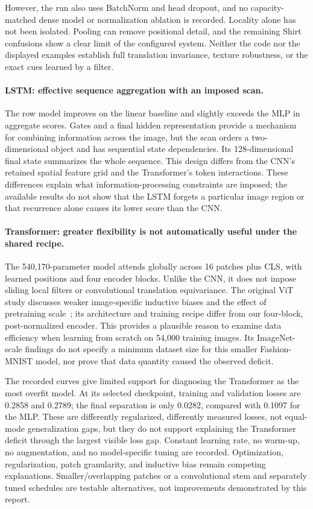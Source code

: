 However, the run also uses BatchNorm and head dropout, and no capacity-matched dense model or normalization ablation is recorded. Locality alone has not been isolated. Pooling can remove positional detail, and the remaining Shirt confusions show a clear limit of the configured system. Neither the code nor the displayed examples establish full translation invariance, texture robustness, or the exact cues learned by a filter.

\paragraph{LSTM: effective sequence aggregation with an imposed scan.}
The row model improves on the linear baseline and slightly exceeds the MLP in aggregate scores. Gates and a final hidden representation provide a mechanism for combining information across the image, but the scan orders a two-dimensional object and has sequential state dependencies. Its 128-dimensional final state summarizes the whole sequence. This design differs from the CNN's retained spatial feature grid and the Transformer's token interactions. These differences explain what information-processing constraints are imposed; the available results do not show that the LSTM forgets a particular image region or that recurrence alone causes its lower score than the CNN.

\paragraph{Transformer: greater flexibility is not automatically useful under the shared recipe.}
The 540,170-parameter model attends globally across 16 patches plus CLS, with learned positions and four encoder blocks. Unlike the CNN, it does not impose sliding local filters or convolutional translation equivariance. The original ViT study discusses weaker image-specific inductive biases and the effect of pretraining scale~\cite{dosovitskiy2021vit}; its architecture and training recipe differ from our four-block, post-normalized encoder. This provides a plausible reason to examine data efficiency when learning from scratch on 54,000 training images. Its ImageNet-scale findings do not specify a minimum dataset size for this smaller Fashion-MNIST model, nor prove that data quantity caused the observed deficit.

The recorded curves give limited support for diagnosing the Transformer as the most overfit model. At its selected checkpoint, training and validation losses are 0.2858 and 0.2789; the final separation is only 0.0282, compared with 0.1097 for the MLP. These are differently regularized, differently measured losses, not equal-mode generalization gaps, but they do not support explaining the Transformer deficit through the largest visible loss gap. Constant learning rate, no warm-up, no augmentation, and no model-specific tuning are recorded. Optimization, regularization, patch granularity, and inductive bias remain competing explanations. Smaller/overlapping patches or a convolutional stem and separately tuned schedules are testable alternatives, not improvements demonstrated by this report.

